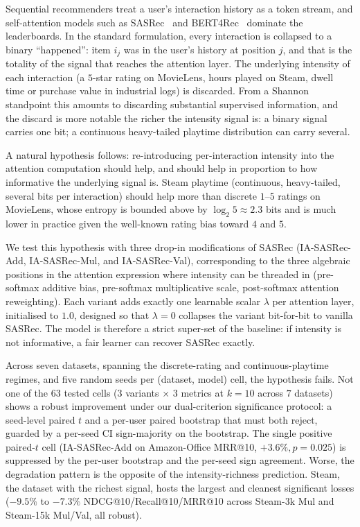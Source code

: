 Sequential recommenders treat a user's interaction history as a token
stream, and self-attention models such as SASRec~\citep{kang2018sasrec}
and BERT4Rec~\citep{sun2019bert4rec} dominate the leaderboards. In
the standard formulation, every interaction is collapsed to a binary
``happened'': item $i_j$ was in the user's history at position $j$,
and that is the totality of the signal that reaches the attention
layer. The underlying intensity of each interaction (a
$5$-star rating on MovieLens, hours played on Steam, dwell time or
purchase value in industrial logs) is discarded. From a Shannon
standpoint this amounts to discarding substantial supervised information, and
the discard is more notable the richer the intensity signal is:
a binary signal carries one bit; a continuous heavy-tailed playtime
distribution can carry several.

A natural hypothesis follows: re-introducing per-interaction intensity
into the attention computation should help, and should help in
proportion to how informative the underlying signal is. Steam
playtime (continuous, heavy-tailed, several bits per interaction)
should help more than discrete $1$--$5$ ratings on
MovieLens, whose entropy is bounded above by $\log_2 5 \approx 2.3$
bits and is much lower in practice given the well-known rating bias
toward $4$ and $5$.

We test this hypothesis with three drop-in modifications of SASRec
(IA-SASRec-Add, IA-SASRec-Mul, and IA-SASRec-Val), corresponding
to the three algebraic positions in the attention expression where
intensity can be threaded in (pre-softmax additive bias, pre-softmax
multiplicative scale, post-softmax attention reweighting).
Each variant adds exactly one learnable scalar $\lambda$ per
attention layer, initialised to $1.0$, designed so that $\lambda{=}0$
collapses the variant bit-for-bit to vanilla SASRec. The model is
therefore a strict super-set of the baseline: if intensity is
not informative, a fair learner can recover SASRec exactly.

Across seven datasets, spanning the discrete-rating and
continuous-playtime regimes, and five random seeds per
(dataset, model) cell, the hypothesis fails. Not one of the $63$
tested cells ($3$ variants $\times$ $3$ metrics at $k{=}10$ across
$7$ datasets) shows a robust improvement under our dual-criterion
significance protocol: a seed-level paired $t$ and a per-user
paired bootstrap that must both reject, guarded by a per-seed
CI sign-majority on the bootstrap. The single
positive paired-$t$ cell (IA-SASRec-Add on Amazon-Office MRR@10,
$+3.6\%, p{=}0.025$) is suppressed by the per-user bootstrap and
the per-seed sign agreement. Worse, the degradation pattern is the
opposite of the intensity-richness prediction. Steam, the
dataset with the richest signal, hosts the largest and cleanest
significant losses ($-9.5\%$ to $-7.3\%$ NDCG@10/Recall@10/MRR@10
across Steam-3k Mul and Steam-15k Mul/Val, all robust).


